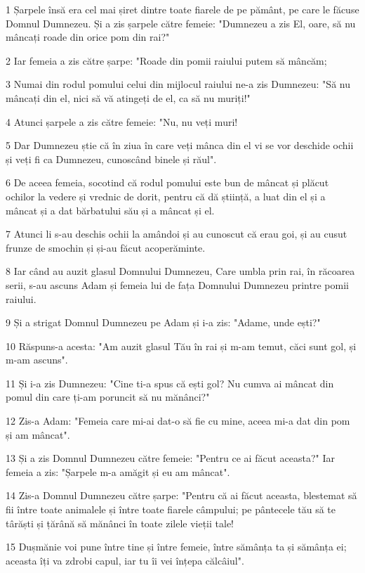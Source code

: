 \par 1 Șarpele însă era cel mai șiret dintre toate fiarele de pe pământ, pe care le făcuse Domnul Dumnezeu. Și a zis șarpele către femeie: "Dumnezeu a zis El, oare, să nu mâncați roade din orice pom din rai?"
\par 2 Iar femeia a zis către șarpe: "Roade din pomii raiului putem să mâncăm;
\par 3 Numai din rodul pomului celui din mijlocul raiului ne-a zis Dumnezeu: "Să nu mâncați din el, nici să vă atingeți de el, ca să nu muriți!"
\par 4 Atunci șarpele a zis către femeie: "Nu, nu veți muri!
\par 5 Dar Dumnezeu știe că în ziua în care veți mânca din el vi se vor deschide ochii și veți fi ca Dumnezeu, cunoscând binele și răul".
\par 6 De aceea femeia, socotind că rodul pomului este bun de mâncat și plăcut ochilor la vedere și vrednic de dorit, pentru că dă știință, a luat din el și a mâncat și a dat bărbatului său și a mâncat și el.
\par 7 Atunci li s-au deschis ochii la amândoi și au cunoscut că erau goi, și au cusut frunze de smochin și și-au făcut acoperăminte.
\par 8 Iar când au auzit glasul Domnului Dumnezeu, Care umbla prin rai, în răcoarea serii, s-au ascuns Adam și femeia lui de fața Domnului Dumnezeu printre pomii raiului.
\par 9 Și a strigat Domnul Dumnezeu pe Adam și i-a zis: "Adame, unde ești?"
\par 10 Răspuns-a acesta: "Am auzit glasul Tău în rai și m-am temut, căci sunt gol, și m-am ascuns".
\par 11 Și i-a zis Dumnezeu: "Cine ti-a spus că ești gol? Nu cumva ai mâncat din pomul din care ți-am poruncit să nu mănânci?"
\par 12 Zis-a Adam: "Femeia care mi-ai dat-o să fie cu mine, aceea mi-a dat din pom și am mâncat".
\par 13 Și a zis Domnul Dumnezeu către femeie: "Pentru ce ai făcut aceasta?" Iar femeia a zis: "Șarpele m-a amăgit și eu am mâncat".
\par 14 Zis-a Domnul Dumnezeu către șarpe: "Pentru că ai făcut aceasta, blestemat să fii între toate animalele și între toate fiarele câmpului; pe pântecele tău să te târăști și țărână să mănânci în toate zilele vieții tale!
\par 15 Dușmănie voi pune între tine și între femeie, între sămânța ta și sămânța ei; aceasta îți va zdrobi capul, iar tu îi vei înțepa călcâiul".
